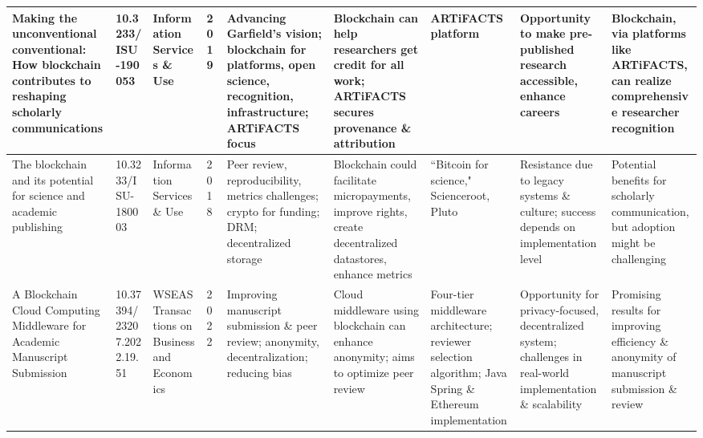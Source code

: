 \documentclass[final]{rc-book-2.14}
\begin{document}
\begin{landscape}
\begin{table}[ht]
\begin{tabularx}{\linewidth}{|p{3.5cm}|p{2.5cm}|p{3cm}|p{1.8cm}|X|X|X|X|X|}
            \hline
            Making the unconventional conventional: How blockchain contributes to reshaping scholarly communications                           & 10.3233/ISU-190053            & Information Services \& Use                                    & 2019                      & Advancing Garfield's vision; blockchain for platforms, open science, recognition, infrastructure; ARTiFACTS focus           & Blockchain can help researchers get credit for all work; ARTiFACTS secures provenance \& attribution                                           & ARTiFACTS platform                                                                                      & Opportunity to make pre-published research accessible, enhance careers                                                              & Blockchain, via platforms like ARTiFACTS, can realize comprehensive researcher recognition            \\
            \hline
            The blockchain and its potential for science and academic publishing                                                               & 10.3233/ISU-180003            & Information Services \& Use                                    & 2018                      & Peer review, reproducibility, metrics challenges; crypto for funding; DRM; decentralized storage                            & Blockchain could facilitate micropayments, improve rights, create decentralized datastores, enhance metrics                                    & ``Bitcoin for science," Scienceroot, Pluto                                                              & Resistance due to legacy systems \& culture; success depends on implementation level                                                & Potential benefits for scholarly communication, but adoption might be challenging                     \\
            \hline
            A Blockchain Cloud Computing Middleware for Academic Manuscript Submission                                                         & 10.37394/23207.2022.19.51     & WSEAS Transactions on Business and Economics                   & 2022                      & Improving manuscript submission \& peer review; anonymity, decentralization; reducing bias                                  & Cloud middleware using blockchain can enhance anonymity; aims to optimize peer review                                                          & Four-tier middleware architecture; reviewer selection algorithm; Java Spring \& Ethereum implementation & Opportunity for privacy-focused, decentralized system; challenges in real-world implementation \& scalability                       & Promising results for improving efficiency \& anonymity of manuscript submission \& review            \\

\end{tabularx}
\end{table}
\end{landscape}
\end{document}
